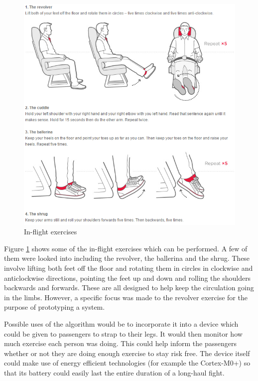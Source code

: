 \begin{figure}[h]
  \centering
    \includegraphics[width=1.0\textwidth]{figures/exercises}
  \caption{In-flight exercises \cite{virgin2015exercises}}
  \label{fig:exercises}
\end{figure}

Figure \ref{fig:exercises} shows some of the in-flight exercises which can be performed. A few of them were looked into including the revolver, the ballerina and the shrug. These involve lifting both feet off the floor and rotating them in circles in clockwise and anticlockwise directions, pointing the feet up and down and rolling the shoulders backwards and forwards. These are all designed to help keep the circulation going in the limbs. However, a specific focus was made to the revolver exercise for the purpose of prototyping a system.

Possible uses of the algorithm would be to incorporate it into a device which could be given to passengers to strap to their legs. It would then monitor how much exercise each person was doing. This could help inform the passengers whether or not they are doing enough exercise to stay risk free. The device itself could make use of energy efficient technologies (for example the Cortex-M0+) so that its battery could easily last the entire duration of a long-haul fight.

